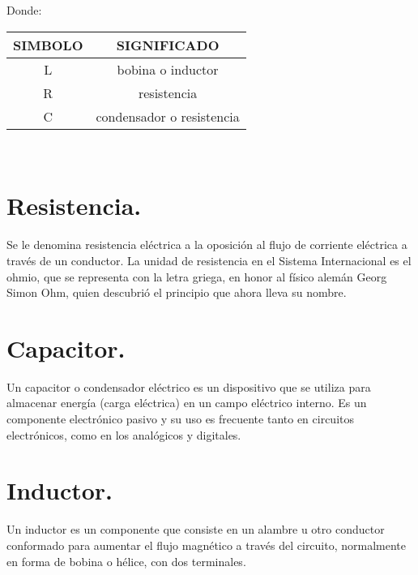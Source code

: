 \documentclass[12pt,a4paper]{article}
\begin{document}
\begin{center}
Donde:
\begin{tabular}{|c|c|}\hline

SIMBOLO       & SIGNIFICADO\\ \hline

L            &   bobina o inductor\\ \hline

R   &   resistencia\\ \hline

C &  condensador o resistencia\\ \hline

\end{tabular}\vspace{5mm}\\
\end{center}
\section*{Resistencia. }
Se le denomina resistencia eléctrica a la oposición al flujo de corriente eléctrica a través de un conductor.  La unidad de resistencia en el Sistema Internacional es el ohmio, que se representa con la letra griega, en honor al físico alemán Georg Simon Ohm, quien descubrió el principio que ahora lleva su nombre.
\section*{Capacitor. }
Un capacitor o condensador eléctrico es un dispositivo que se utiliza para almacenar energía (carga eléctrica) en un campo eléctrico interno. Es un componente electrónico pasivo y su uso es frecuente tanto en circuitos electrónicos, como en los analógicos y digitales.
\section*{Inductor. }
Un inductor es un componente que consiste en un alambre u otro conductor conformado para aumentar el flujo magnético a través del circuito, normalmente en forma de bobina o hélice, con dos terminales.\\
\end{document}
